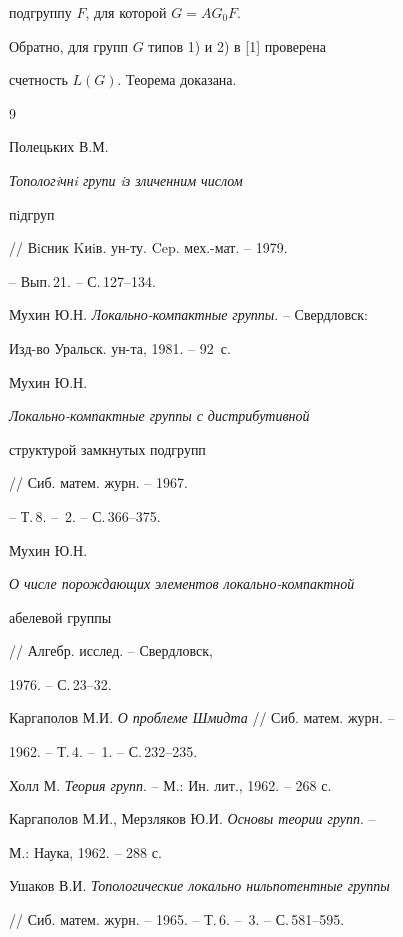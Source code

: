 подгруппу $F$, для которой $G=AG_0F$. 


 


Обратно, для групп $G$ типов 1) и 2) в [1] проверена  


счетность $L(G)$. Теорема доказана. 


 


\begin{thebibliography}{9} 


 




Полецьких В.М. {\em Топологiчнi групи iз зличенним числом  


пiдгруп} // Вiсник Kиiв. ун-ту. Cep. мех.-мат. -- 1979. 


-- Вып.\,21. -- С.\,127--134. 




Мухин Ю.Н. {\em Локально-компактные группы}. -- Свердловск: 


Изд-во Уральск. ун-та, 1981. -- 92~с. 




Мухин Ю.Н. {\em Локально-компактные группы с дистрибутивной  


структурой замкнутых подгрупп} // Сиб. матем. журн. -- 1967. 


-- Т.\,8. -- \No\,2. -- С.\,366--375. 




Мухин Ю.Н. {\em О числе порождающих элементов локально-компактной 


абелевой группы} // Алгебр. исслед. -- Свердловск, 


1976. -- С.\,23--32. 




Каргаполов М.И. {\em О проблеме Шмидта} // Сиб. матем. журн. -- 


1962. -- Т.\,4. -- \No\,1. -- С.\,232--235. 




Холл М. {\em Теория групп}. -- М.: Ин. лит., 1962. -- 268 с. 




Каргаполов М.И., Мерзляков Ю.И. {\em Основы теории групп}. -- 


М.: Наука, 1962. -- 288 с. 




Ушаков В.И. {\em Топологические локально нильпотентные группы} 


// Сиб. матем. журн. -- 1965. -- Т.\,6. -- \No\,3. -- С.\,581--595.  


 


\end{thebibliography} 


 


\vskip 2cm 


 






 


\label{end} 


 


